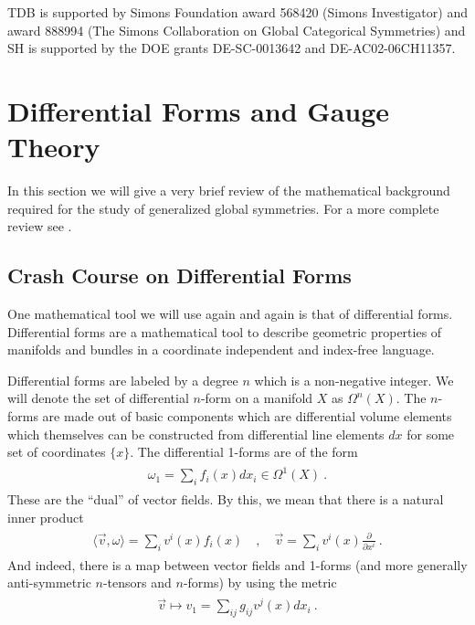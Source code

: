 \documentclass[11pt]{article}
\newcommand{\eq}[1]{\begin{align}\begin{split}#1\end{split}\end{align}}
\begin{document}
TDB is supported by Simons Foundation award 568420 (Simons
Investigator) and award 888994 (The Simons Collaboration on Global Categorical Symmetries) and SH is supported by  the DOE grants DE-SC-0013642 and DE-AC02-06CH11357.  

\appendix  

\section{Differential Forms and Gauge Theory}
\label{app:differentialforms}

In this section we will give a very brief review of the mathematical background required for the study of generalized global symmetries. For a more complete review see \cite{Nakahara:2003nw}. 

\subsection{Crash Course on Differential Forms}

One mathematical tool we will use again and again is that of differential forms. Differential forms are a mathematical tool to describe geometric properties of manifolds and bundles in a coordinate independent and index-free language. 

Differential forms are labeled by a degree $n$ which is a non-negative integer. We will denote the set of differential $n$-form on a manifold $X$ as $\Omega^n(X)$. The $n$-forms are made out of basic components which are differential volume elements which themselves can be constructed from differential line elements $dx$ for some set of coordinates $\{x\}$. The differential 1-forms are of the form 
\eq{
\omega_1=\sum_i f_i(x) dx_i\in \Omega^1(X)~.
} 
These are the ``dual'' of vector fields. By this, we mean that there is a natural inner product 
\eq{
\langle \vec{v},\omega\rangle=\sum_i v^i(x) f_i(x)\quad, \quad \vec{v}=\sum_i v^i(x)\frac{\partial}{\partial x^i}~. 
}
And indeed, there is a map between vector fields and 1-forms (and more generally anti-symmetric $n$-tensors and $n$-forms) by using the metric
\eq{\label{vecduality}
\vec{v}\longmapsto v_1=\sum_{ij}g_{ij}v^j(x) dx_i~. 
}
\end{document}
